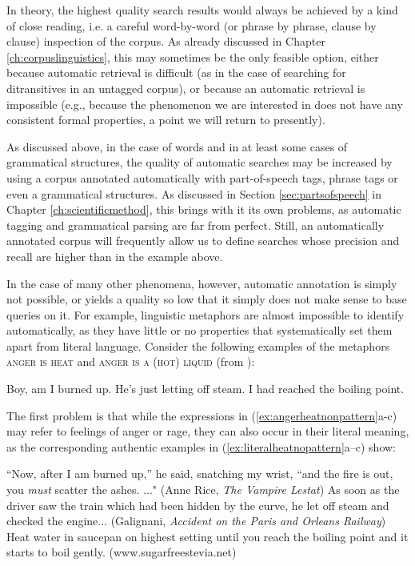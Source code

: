 In theory, the highest quality search results would always be achieved by a kind of close reading, i.e. a careful word-by-word (or phrase by phrase, clause by clause) inspection of the corpus. As already discussed in Chapter \ref{ch:corpuslinguistics}, this may sometimes be the only feasible option, either because automatic retrieval is difficult (as in the case of searching for ditransitives in an untagged corpus), or because an automatic retrieval is impossible (e.g., because the phenomenon we are interested in does not have any consistent formal properties, a point we will return to presently).

As discussed above, in the case of words and in at least some cases of grammatical structures, the quality of automatic searches may be increased by using a corpus annotated automatically with part-of-speech tags, phrase tags or even a grammatical structures.  As discussed in Section \ref{sec:partsofspeech} in Chapter \ref{ch:scientificmethod}, this brings with it its own problems, as automatic tagging and grammatical parsing are far from perfect. Still, an automatically annotated corpus will frequently allow us to define searches whose precision and recall are higher than in the example above.

In the case of many other phenomena, however, automatic annotation is simply not possible, or yields a quality so low that it simply does not make sense to base queries on it. For example, linguistic metaphors are almost impossible to identify automatically, as they have little or no properties that systematically set them apart from literal language. Consider the following examples of the metaphors \textsc{anger is heat} and \textsc{anger is a (hot) liquid} (from \citet{lakoff_cognitive_1987}):

\begin{exe}
\ex
\begin{xlist} 
\label{ex:angerheatnonpattern}
\ex Boy, am I burned up.
\ex He's just letting off steam.
\ex I had reached the boiling point.
\end{xlist}
\end{exe}

The first problem is that while the expressions in (\ref{ex:angerheatnonpattern}a-c) may refer to feelings of anger or rage, they can also occur in their literal meaning, as the corresponding authentic examples in (\ref{ex:literalheatnopattern}a--c) show:

\begin{exe}
\ex
\begin{xlist} 
\label{ex:literalheatnopattern}
\ex ``Now, after I am burned up,'' he said, snatching my wrist, ``and the fire is out, you \textit{must} scatter the ashes. ..." (Anne Rice, \textit{The Vampire Lestat})
\ex As soon as the driver saw the train which had been hidden by the curve, he let off steam and checked the engine... (Galignani, \textit{Accident on the Paris and Orleans Railway})
\ex Heat water in saucepan on highest setting until you reach the boiling point and it starts to boil gently. (www.sugarfreestevia.net)
\end{xlist}
\end{exe}

